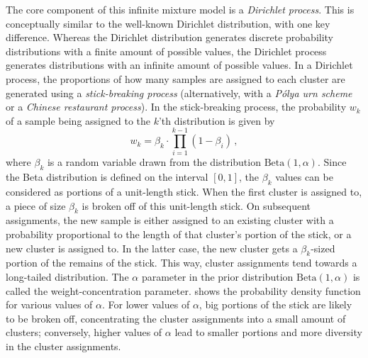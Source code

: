 The core component of this infinite mixture model is a \emph{Dirichlet
process}. This is conceptually similar to the well-known Dirichlet
distribution, with one key difference. Whereas the Dirichlet distribution
generates discrete probability distributions with a finite amount of possible
values, the Dirichlet process generates distributions with an infinite amount
of possible values. In a Dirichlet process, the proportions of how many
samples are assigned to each cluster are generated using a
\emph{stick-breaking process} (alternatively, with a \emph{P\'{o}lya urn
scheme} or a \emph{Chinese restaurant process})\citep{dirichlet}. In the
stick-breaking process, the probability $w_k$ of a sample being assigned to the
$k$'th distribution is given by
\begin{equation}
  w_k = \beta_k \cdot \prod_{i=1}^{k-1} (1 - \beta_i)\,,
\end{equation}
where $\beta_k$ is a random variable drawn from the distribution
$\mathrm{Beta}(1, \alpha)$. Since the Beta distribution is defined on the
interval $\left[0, 1\right]$, the $\beta_k$ values can be considered as
portions of a unit-length stick. When the first cluster is assigned to, a
piece of size $\beta_k$ is broken off of this unit-length stick. On subsequent
assignments, the new sample is either assigned to an existing cluster with a
probability proportional to the length of that cluster's portion of the stick,
or a new cluster is assigned to. In the latter case, the new cluster gets a
$\beta_k$-sized portion of the remains of the stick. This way, cluster
assignments tend towards a long-tailed distribution. The $\alpha$ parameter in
the prior distribution $\mathrm{Beta}(1, \alpha)$ is called the
weight-concentration parameter.  shows the probability
density function for various values of $\alpha$.
For lower values of $\alpha$, big portions of the stick are likely to be
broken off, concentrating the cluster assignments into a small amount of clusters;
conversely, higher values of $\alpha$ lead to smaller portions and more
diversity in the cluster assignments.


